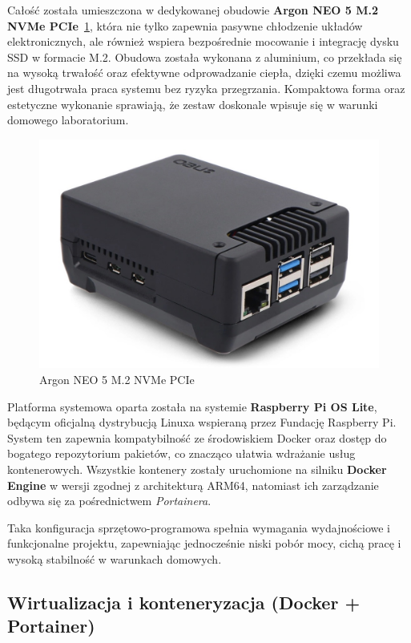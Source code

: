 \documentclass[
    left=2.5cm,         %
    right=2.5cm,        %
    top=2.5cm,          %
    bottom=3cm,         %
    bindingoffset=6mm,  %
    nohyphenation=true %
]{eiti/eiti-thesis} %
\begin{document}
Całość została umieszczona w dedykowanej obudowie \textbf{Argon NEO 5 M.2 NVMe PCIe}~\ref{fig:argon-neo}, która nie tylko zapewnia pasywne chłodzenie układów elektronicznych, ale również wspiera bezpośrednie mocowanie i integrację dysku SSD w formacie M.2. Obudowa została wykonana z aluminium, co przekłada się na wysoką trwałość oraz efektywne odprowadzanie ciepła, dzięki czemu możliwa jest długotrwała praca systemu bez ryzyka przegrzania. Kompaktowa forma oraz estetyczne wykonanie sprawiają, że zestaw doskonale wpisuje się w warunki domowego laboratorium.

\begin{figure}[H]
    \centering
    \includegraphics[width=\textwidth]{img/argon_neo.png}
    \caption{Argon NEO 5 M.2 NVMe PCIe}
    \label{fig:argon-neo}
\end{figure}

Platforma systemowa oparta została na systemie \textbf{Raspberry Pi OS Lite}\cite{raspberry-os}, będącym oficjalną dystrybucją Linuxa wspieraną przez Fundację Raspberry Pi. System ten zapewnia kompatybilność ze środowiskiem Docker oraz dostęp do bogatego repozytorium pakietów, co znacząco ułatwia wdrażanie usług kontenerowych. Wszystkie kontenery zostały uruchomione na silniku \textbf{Docker Engine} w wersji zgodnej z architekturą ARM64, natomiast ich zarządzanie odbywa się za pośrednictwem \textit{Portainera}\cite{portainer-docs}.

Taka konfiguracja sprzętowo-programowa spełnia wymagania wydajnościowe i funkcjonalne projektu, zapewniając jednocześnie niski pobór mocy, cichą pracę i wysoką stabilność w warunkach domowych.

\subsection{Wirtualizacja i konteneryzacja (Docker + Portainer)}
\end{document}
